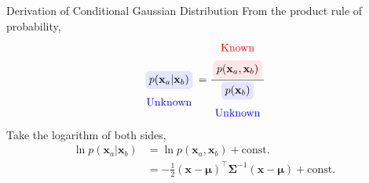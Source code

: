 \documentclass[10pt]{beamer}
\newcommand{\highlightcap}[3][yellow]{\tikz[baseline=(x.base)]{\node[rectangle,rounded corners,fill=#1!10](x){$#2$} node[below of=x, node distance=2em, color=#1]{#3};}}
\newcommand{\highlightcaphead}[3][yellow]{\tikz[baseline=(x.base)]{\node[rectangle,rounded corners,fill=#1!10](x){$#2$} node[above of=x, node distance=2em, color=#1]{#3};}}
\begin{document}
    \begin{frame}{Derivation of Conditional Gaussian Distribution}
        From the product rule of probability, 
        \begin{align*}
            \highlightcap[blue]{p(\mathbf x_a | \mathbf x_b)}{Unknown}
            = \frac{\highlightcaphead[red]{p(\mathbf x_a, \mathbf x_b)}{Known}}{\highlightcap[blue]{p(\mathbf x_b)}{Unknown}}
        \end{align*}
        Take the logarithm of both sides, 
        \begin{align*}
            \ln p(\mathbf x_a | \mathbf x_b) 
            &= \ln p(\mathbf x_a, \mathbf x_b) + \mathrm{const.} \\
            &= -\frac{1}{2}(\mathbf x - \bm\mu)^\top\bm\Sigma^{-1}(\mathbf x - \bm\mu) + \mathrm{const.}
        \end{align*}

    \end{frame}
    
\end{document}
